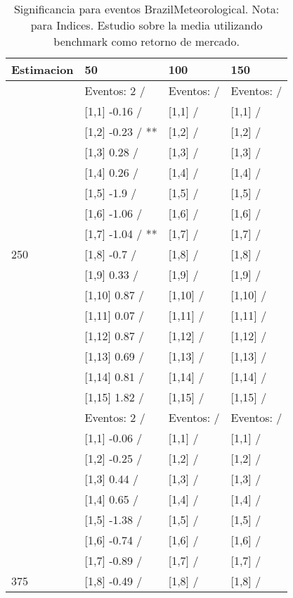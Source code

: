 \begin{table}

\caption{Significancia para eventos BrazilMeteorological. Nota: para Indices. Estudio sobre la media utilizando benchmark como retorno de mercado.}
\centering
\begin{tabular}[t]{llll}
\toprule
Estimacion & 50 & 100 & 150\\
\midrule
 & Eventos:  2 / & Eventos:   / & Eventos:   /\\
 & {}[1,1] -0.16  / & {}[1,1]  / & {}[1,1]  /\\
 & {}[1,2] -0.23  / ** & {}[1,2]  / & {}[1,2]  /\\
 & {}[1,3] 0.28  / & {}[1,3]  / & {}[1,3]  /\\
 & {}[1,4] 0.26  / & {}[1,4]  / & {}[1,4]  /\\
\addlinespace
 & {}[1,5] -1.9  / & {}[1,5]  / & {}[1,5]  /\\
 & {}[1,6] -1.06  / & {}[1,6]  / & {}[1,6]  /\\
 & {}[1,7] -1.04  / ** & {}[1,7]  / & {}[1,7]  /\\
250 & {}[1,8] -0.7  / & {}[1,8]  / & {}[1,8]  /\\
 & {}[1,9] 0.33  / & {}[1,9]  / & {}[1,9]  /\\
\addlinespace
 & {}[1,10] 0.87  / & {}[1,10]  / & {}[1,10]  /\\
 & {}[1,11] 0.07  / & {}[1,11]  / & {}[1,11]  /\\
 & {}[1,12] 0.87  / & {}[1,12]  / & {}[1,12]  /\\
 & {}[1,13] 0.69  / & {}[1,13]  / & {}[1,13]  /\\
 & {}[1,14] 0.81  / & {}[1,14]  / & {}[1,14]  /\\
\addlinespace
 & {}[1,15] 1.82  / & {}[1,15]  / & {}[1,15]  /\\
 & Eventos:  2 / & Eventos:   / & Eventos:   /\\
 & {}[1,1] -0.06  / & {}[1,1]  / & {}[1,1]  /\\
 & {}[1,2] -0.25  / & {}[1,2]  / & {}[1,2]  /\\
 & {}[1,3] 0.44  / & {}[1,3]  / & {}[1,3]  /\\
\addlinespace
 & {}[1,4] 0.65  / & {}[1,4]  / & {}[1,4]  /\\
 & {}[1,5] -1.38  / & {}[1,5]  / & {}[1,5]  /\\
 & {}[1,6] -0.74  / & {}[1,6]  / & {}[1,6]  /\\
 & {}[1,7] -0.89  / & {}[1,7]  / & {}[1,7]  /\\
375 & {}[1,8] -0.49  / & {}[1,8]  / & {}[1,8]  /\\

\end{tabular}
\end{table}
